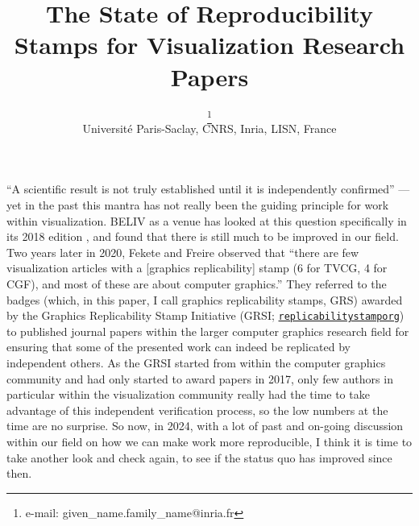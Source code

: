 \documentclass[conference]{vgtc}                     %
\title{The State of Reproducibility Stamps for Visualization Research Papers}
\author{%
  \authororcid{Tobias Isenberg}{0000-0001-7953-8644}\thanks{e-mail: given\_name.family\_name@inria.fr}\\ %
        \scriptsize Université Paris-Saclay, CNRS, Inria, LISN, France%
}
\begin{document}


\maketitle

``A scientific result is not truly established until it is independently confirmed'' \cite{Boisvert:2016:IR}---yet in the past this mantra has not really been the guiding principle for work within visualization. BELIV as a venue has looked at this question specifically in its 2018 edition \cite{Haroz:2018:OPV,Kosara:2018:SRC,Sukumar:2018:TDU,Valdez:2018:RRR}, and found that there is still much to be improved in our field. Two years later in 2020, Fekete and Freire \cite{Fekete:2020:ERV} observed that ``there are few visualization articles with a [graphics replicability] stamp (6 for TVCG, 4 for CGF), and most of these are about computer graphics.'' They referred to the badges (which, in this paper, I call graphics replicability\footnotemark{} stamps, GRS) awarded by the Graphics Replicability Stamp Initiative (GRSI; \href{https://www.replicabilitystamp.org/}{\texttt{replicabilitystamporg}}) to published journal\footnotemark{} papers within the larger computer graphics research field for ensuring that some of the presented work can indeed be replicated by independent others. As the GRSI started from within the computer graphics community and had only started to award papers in 2017, only few authors in particular within the visualization community really had the time to take advantage of this independent verification process, so the low numbers at the time are no surprise. So now, in 2024, with a lot of past and on-going discussion within our field on how we can make work more reproducible, I think it is time to take another look and check again, to see if the status quo has improved since then.
\end{document}
